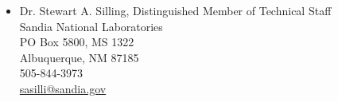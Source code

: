 \begin{itemize}
    \item Dr. Stewart A. Silling, Distinguished Member of Technical Staff \\ Sandia National Laboratories\\ PO Box 5800, MS 1322 \\ Albuquerque, NM 87185\\ 505-844-3973 \\ \href{mailto:sasilli@sandia.gov}{sasilli@sandia.gov}
    


  \end{itemize}

